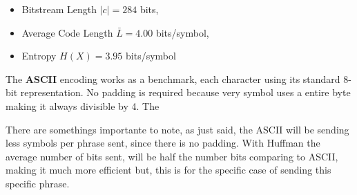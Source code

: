 \begin{itemize}
  \item Bitstream Length $\lvert c\rvert = 284$ bits,
  \item Average Code Length $\bar L = 4.00$ bits/symbol,
  \item Entropy $H(X)=3.95$ bits/symbol
\end{itemize}



The \textbf{ASCII} encoding works as a benchmark, each character using its standard 8-bit representation. No padding is required because very symbol uses a entire byte making it always divisible by 4. The 

There are somethings importante to note, as just said, the ASCII will be sending less symbols per phrase sent, since there is no padding. With Huffman the average number of bits sent, will be half the number bits comparing to ASCII, making it much more efficient but, this is for the specific case of sending this specific phrase. 

